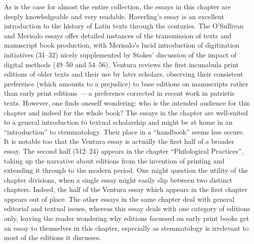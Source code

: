 \documentclass{article}
\begin{document}
As is the case for almost the entire collection, the essays in
this chapter are deeply knowledgeable and very readable. Haverling's
essay is an excellent introduction to the history of Latin texts through
the centuries. The O'Sullivan and Merisalo essays offer detailed
instances of the transmission of texts and manuscript book production,
with Merisalo's lucid introduction of digitization initiatives (31--32)
nicely supplemented by Stokes' discussion of the impact of digital
methods (49--50 and 54--56). Ventura reviews the first incunabula print
editions of older texts and their use by later scholars, observing their
consistent preference (which amounts to a prejudice) to base editions on
manuscripts rather than early print editions –– a preference corrected
in recent work in patristic texts. However, one finds oneself wondering:
who is the intended audience for this chapter and indeed for the whole
book? The essays in the chapter are well-suited to a general
introduction to textual scholarship and might be at home in an
``introduction'' to stemmatology. Their place in a ``handbook'' seems
less secure. It is notable too that the Ventura essay is actually the
first half of a broader essay. The second half (512--24) appears in the
chapter ``Philological Practices'', taking up the narrative about
editions from the invention of printing and extending it through to the
modern period. One might question the utility of the chapter divisions,
when a single essay might easily slip between two distinct chapters.
Indeed, the half of the Ventura essay which appears in the first chapter
appears out of place. The other essays in the same chapter deal with
general editorial and textual issues, whereas this essay deals with one
category of editions only, leaving the reader wondering why editions
focussed on early print books get an essay to themselves in this
chapter, especially as stemmatology is irrelevant to most of the
editions it discusses.
\end{document}
